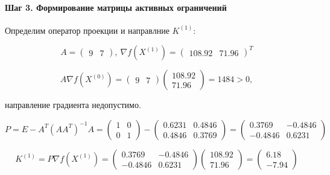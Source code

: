 \paragraph{Шаг 3. Формирование матрицы активных ограничений}

Определим оператор проекции и направлние $K^{(1)}$:

\begin{equation*}
	A = \begin{pmatrix} 9 & 7 \end{pmatrix},\ %
	\nabla f(X^{(1)}) = \begin{pmatrix} 108.92 & 71.96 \end{pmatrix}^T
\end{equation*}

\begin{equation*}
	A \nabla f(X^{(0)}) = \begin{pmatrix} 9 & 7 \end{pmatrix}
	\begin{pmatrix} 108.92 \\ 71.96 \end{pmatrix}
	=
	1484
	> 0,
\end{equation*}

направление градиента недопустимо.

\begin{equation*}
P = E - A^T \left(A A^T\right)^{-1} A = \begin{pmatrix} 1 & 0 \\ 0 & 1 \end{pmatrix} - \begin{pmatrix} 0.6231 & 0.4846 \\ 0.4846 & 0.3769 \end{pmatrix} = \begin{pmatrix} 0.3769 & -0.4846 \\ -0.4846 & 0.6231 \end{pmatrix}
\end{equation*}

\begin{equation*}
	K^{(1)} = P \nabla f(X^{(1)}) = \begin{pmatrix} 0.3769 & -0.4846 \\ -0.4846 & 0.6231 \end{pmatrix} \begin{pmatrix} 108.92 \\ 71.96 \end{pmatrix} = \begin{pmatrix} 6.18 \\ -7.94 \end{pmatrix}
\end{equation*}

